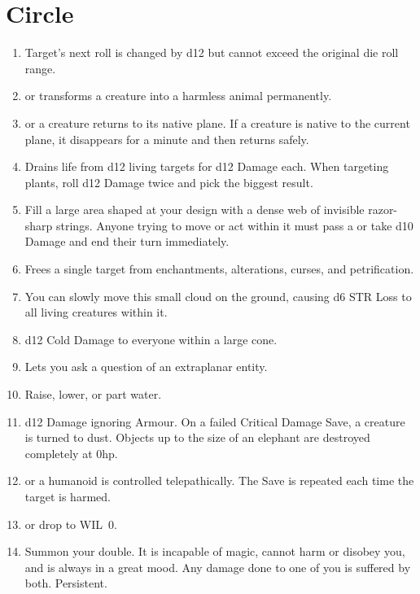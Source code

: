 \documentclass[itdr]{subfiles}
\begin{document}
\section{ Circle}
\def \spellcircle {5}
\begin{enumerate}
	\item {} Target's next roll is changed by d12 but cannot exceed the original die roll range.
	\item {}  or transforms a creature into a harmless animal permanently.
	\item {}  or a creature returns to its native plane. If a creature is native to the current plane, it disappears for a minute and then returns safely.
	\item {} Drains life from d12 living targets for d12 Damage each. When targeting plants, roll d12 Damage twice and pick the biggest result.
	\item {} Fill a large area shaped at your design with a dense web of invisible razor-sharp strings. Anyone trying to move or act within it must pass a  or take d10 Damage and end their turn immediately.
	\item {} Frees a single target from enchantments, alterations, curses, and \mbox{petrification}.
	\item {} You can slowly move this small cloud on the ground, causing d6 STR Loss to all living creatures within it.
	\item {} d12 Cold Damage to everyone within a large cone.
	\item {} Lets you ask a question of an extraplanar entity.
	\item {} Raise, lower, or part water.
	\item {} d12 Damage ignoring Armour. On a failed Critical Damage Save, a creature is turned to dust. Objects up to the size of an elephant are destroyed completely at 0hp.
	\item {}  or a humanoid is controlled telepathically. The Save is repeated each time the target is harmed.
	\item {}  or drop to WIL~0.
	\item {} Summon your double. It is incapable of magic, cannot harm or disobey you, and is always in a great mood. Any damage done to one of you is suffered by both. \mbox{Persistent.}

\end{enumerate}
\end{document}
